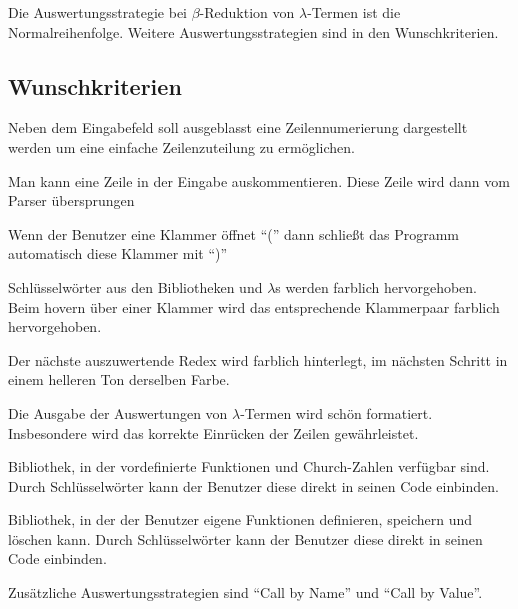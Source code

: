 \documentclass[parskip=full,11pt,twoside]{scrartcl}
\begin{document}
Die Auswertungsstrategie bei $\beta$-Reduktion von $\lambda$-Termen ist die Normalreihenfolge. Weitere Auswertungsstrategien sind in den Wunschkriterien.


\newpage
\subsection{Wunschkriterien}

Neben dem Eingabefeld soll ausgeblasst eine Zeilennumerierung dargestellt werden um eine einfache Zeilenzuteilung zu ermöglichen.

Man kann eine Zeile in der Eingabe auskommentieren. Diese Zeile wird dann vom Parser übersprungen

Wenn der Benutzer eine Klammer öffnet \enquote{(} dann schließt das Programm automatisch diese Klammer mit \enquote{)}

Schlüsselwörter aus den Bibliotheken und $\lambda$s werden farblich hervorgehoben. Beim hovern über einer Klammer wird das entsprechende Klammerpaar farblich hervorgehoben.

Der nächste auszuwertende Redex wird farblich hinterlegt, im nächsten Schritt in einem helleren Ton derselben Farbe.

Die Ausgabe der Auswertungen von $\lambda$-Termen wird schön formatiert. Insbesondere wird das korrekte Einrücken der Zeilen gewährleistet.

Bibliothek, in der vordefinierte Funktionen und Church-Zahlen verfügbar sind. Durch Schlüsselwörter kann der Benutzer diese direkt in seinen Code einbinden.

Bibliothek, in der der Benutzer eigene Funktionen definieren, speichern und löschen kann. Durch Schlüsselwörter kann der Benutzer diese direkt in seinen Code einbinden.

Zusätzliche Auswertungsstrategien sind \enquote{Call by Name} und \enquote{Call by Value}.
\end{document}
